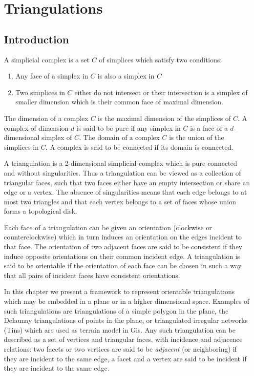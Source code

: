 \newcommand{\triangulationcomment}[1]{}

\chapter{Triangulations} \label{I1_Chapter_Triangulations}

\section{Introduction}

A simplicial complex is a set ${C}$ of simplices which satisfy
two conditions:
\begin{enumerate}
\item Any face of a simplex in ${  C}$ is also a simplex in ${  C}$
\item Two simplices in ${  C}$ either do not intersect
or their intersection is  a simplex of smaller dimension
which is their common face of maximal dimension.
\end{enumerate}
The dimension of a complex ${  C}$ is the maximal dimension 
of the simplices
of ${  C}$. A complex of dimension $d$ is said to be pure
if any simplex in ${  C}$ is a face of a $d$-dimensional
simplex of ${  C}$.
The domain of a complex ${  C}$ is the union of the simplices
in ${  C}$. A complex is said to be connected if its domain is connected.

A 
triangulation is a 2-dimensional simplicial complex which is pure
connected and without singularities. Thus a triangulation
can be viewed as a collection of triangular faces,
such that two faces either have an empty intersection or share an edge or a vertex.
The absence of singularities means that each edge belongs to 
at most two triangles and that each vertex belongs  to a set  of faces
whose union forms a topological disk.

Each face of a triangulation can be given an orientation
(clockwise or counterclockwise) which in turn induces an orientation
on the edges incident to that face. The orientation of two adjacent
faces are said to be consistent if they induce
opposite orientations on their common incident edge.
A triangulation is said to be orientable if 
the orientation of each face can be chosen in such a way
that all pairs of incident faces have consistent orientations. 


In this chapter we present a framework to represent
orientable triangulations which  may  be embedded 
in a plane or in a higher dimensional space.
Examples of such triangulations 
are triangulations of a simple polygon in the plane, the
Delaunay triangulations of points in the plane, or triangulated
irregular networks ({\sc Tin}s) which are used as terrain model in
{\sc Gis}.  
Any such  triangulation can be described as a set of  vertices and
triangular faces,  with incidence and adjacence relations:
two facets or two vertices are said to be {\em adjacent}
 (or neighboring) if they are incident to the same edge,
a facet and a vertex are said to be incident if they are incident to the same
edge.

